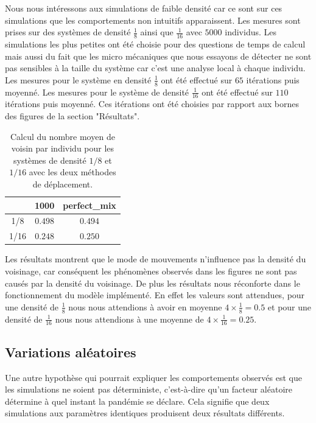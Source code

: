 Nous nous intéressons aux simulations de faible densité car ce sont sur ces simulations que les comportements non intuitifs apparaissent. Les mesures sont prises sur des systèmes de densité $\frac{1}{8}$ ainsi que $\frac{1}{16}$ avec $5000$ individus. Les simulations les plus petites ont été choisie pour des questions de temps de calcul mais aussi du fait que les micro mécaniques que nous essayons de détecter ne sont pas sensibles à la taille du système car c'est une analyse local à chaque individu.\\

Les mesures pour le système en densité $\frac{1}{8}$ ont été effectué sur $65$ itérations puis moyenné. Les mesures pour le système de densité $\frac{1}{16}$ ont été effectué sur $110$ itérations puis moyenné. Ces itérations ont été choisies par rapport aux bornes des figures de la section "Résultats".

\begin{table}[H]
\centering
\captionsetup{justification=centering}
\caption[Voisinage moyen : SI]{Calcul du nombre moyen de voisin par individu pour les systèmes de densité $1/8$ et $1/16$ avec les deux méthodes de déplacement.\label{tab:grid}}
\begin{tabular}{@{\extracolsep{\fill} } c|| c| c|}
 & 1000 & perfect\_mix\\ 
\midrule
\midrule
1/8 & $0.498$ & $0.494$\\
\midrule
1/16 & $0.248$ & $0.250$\\
\bottomrule
\end{tabular}
\end{table}

Les résultats montrent que le mode de mouvements n'influence pas la densité du voisinage, car conséquent les phénomènes observés dans les figures ne sont pas causés par la densité du voisinage. De plus les résultats nous réconforte dans le fonctionnement du modèle implémenté. En effet les valeurs sont attendues, pour une densité de $\frac{1}{8}$ nous nous attendions à avoir en moyenne $4\times \frac{1}{8} = 0.5$ et pour une densité de $\frac{1}{16}$ nous nous attendions à une moyenne de $4\times \frac{1}{16} = 0.25$.

\subsection{Variations aléatoires}

Une autre hypothèse qui pourrait expliquer les comportements observés est que les simulations ne soient pas déterministe, c'est-à-dire qu'un facteur aléatoire détermine à quel instant la pandémie se déclare. Cela signifie que deux simulations aux paramètres identiques produisent deux résultats différents.\\

